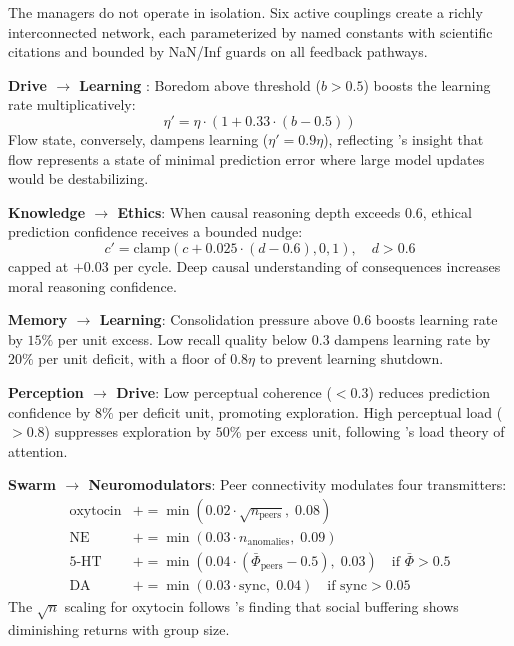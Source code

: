 \documentclass[12pt]{book}
\begin{document}
The managers do not operate in isolation. Six active couplings create a richly interconnected network, each parameterized by named constants with scientific citations and bounded by NaN/Inf guards on all feedback pathways.

\textbf{Drive $\to$ Learning} \citep{friston2010free}: Boredom above threshold ($b > 0.5$) boosts the learning rate multiplicatively:
\begin{equation}
\eta' = \eta \cdot (1 + 0.33 \cdot (b - 0.5))
\end{equation}
Flow state, conversely, dampens learning ($\eta' = 0.9\eta$), reflecting \citet{friston2010free}'s insight that flow represents a state of minimal prediction error where large model updates would be destabilizing.

\textbf{Knowledge $\to$ Ethics}: When causal reasoning depth exceeds 0.6, ethical prediction confidence receives a bounded nudge:
\begin{equation}
c' = \text{clamp}(c + 0.025 \cdot (d - 0.6), 0, 1), \quad d > 0.6
\end{equation}
capped at $+0.03$ per cycle. Deep causal understanding of consequences increases moral reasoning confidence.

\textbf{Memory $\to$ Learning}: Consolidation pressure above 0.6 boosts learning rate by $15\%$ per unit excess. Low recall quality below 0.3 dampens learning rate by $20\%$ per unit deficit, with a floor of $0.8\eta$ to prevent learning shutdown.

\textbf{Perception $\to$ Drive}: Low perceptual coherence ($< 0.3$) reduces prediction confidence by $8\%$ per deficit unit, promoting exploration. High perceptual load ($> 0.8$) suppresses exploration by $50\%$ per excess unit, following \citet{friston2010free}'s load theory of attention.

\textbf{Swarm $\to$ Neuromodulators}: Peer connectivity modulates four transmitters:
\begin{align}
\text{oxytocin} &\mathrel{+}= \min(0.02 \cdot \sqrt{n_{\text{peers}}}, \; 0.08) \\
\text{NE} &\mathrel{+}= \min(0.03 \cdot n_{\text{anomalies}}, \; 0.09) \\
\text{5-HT} &\mathrel{+}= \min(0.04 \cdot (\bar{\Phi}_{\text{peers}} - 0.5), \; 0.03) \quad \text{if } \bar{\Phi} > 0.5 \\
\text{DA} &\mathrel{+}= \min(0.03 \cdot \text{sync}, \; 0.04) \quad \text{if sync} > 0.05
\end{align}
The $\sqrt{n}$ scaling for oxytocin follows \citet{kosfeld2005oxytocin}'s finding that social buffering shows diminishing returns with group size.
\end{document}
